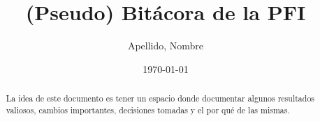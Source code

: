 \documentclass[a4paper,12pt]{article}
\begin{document}
\title{(Pseudo) Bit\'acora de la PFI}
\author{Apellido, Nombre}
\date{\today}
\maketitle

\begin{abstract}
    La idea de este documento es tener un espacio donde documentar algunos resultados valiosos, cambios importantes, decisiones tomadas y el por qu\'e de las mismas.
\end{abstract}

\tableofcontents
\newpage

 \newpage
 \newpage
 \newpage
\end{document}
